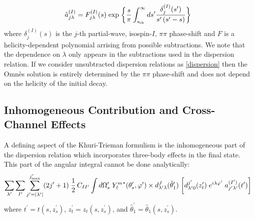   \begin{equation}
    \hat{a}_{j\lambda}^{(I)} =
    F^{(I)}_{j\lambda}(s) \; \text{exp} \;
    \bigg\{
    \frac{s}{\pi} \int_{{s_\text{th}}}^\infty ds^\prime
     \frac{
     \delta_{j}^{(I)}(s^\prime)
     }{
     s^\prime \, (s^\prime - s)
     }
    \bigg\}
  \end{equation}
where \(\delta_j^{(I)}(s)\) is the \(j\)-th partial-wave, isospin-\(I\), \(\pi\pi\) phase-shift and \(F\) is a helicity-dependent polynomial arrising from possible subtractions.
We note that the dependence on \(\lambda\) only appears in the subtractions used in the dispersion relation. If we consider unsubtracted dispersion relations as \cref{dispersion} then the Omn\`{e}s solution is entirely determined by the \(\pi\pi\) phase-shift and does not depend on the helicity of the initial decay.
\subsection{Inhomogeneous Contribution and Cross-Channel Effects}
 A defining aspect of the Khuri-Trieman formulism is the inhomogeneous part of the dispersion relation which incorporates three-body effects in the final state. This part of the angular integral cannot be done analytically:
  \begin{align}
    \label{eq:cross-0}
   \sum_{\lambda^\prime} \sum_{I^\prime} \sum_{{j^\prime}=|{\lambda^\prime}|}^{j^\prime_\text{max}} (2{j^\prime} + 1) \; \frac{1}{2} \, C_{II^\prime} \int d\Omega^\prime_s
    \; {Y^m_\ell}^*(\theta_s^\prime, \varphi^\prime)
    \times  d^J_{{\lambda^\prime} \lambda}(\hat{\theta}^\prime_1) \;
    \bigg[
     d_{{\lambda^\prime} 0}^{j^\prime}(z_t^\prime) \; e^{i\lambda \varphi^\prime} \; a^{({I^\prime})}_{{j^\prime} {\lambda^\prime}}(t^\prime)
    \bigg]
  \end{align}
where \(t^\prime = t(s,z_s^\prime)\), \(z_t^\prime = z_t(s,z_s^\prime)\), and \(\hat{\theta}_1^\prime = \hat{\theta}_1(s,z_s^\prime)\).

